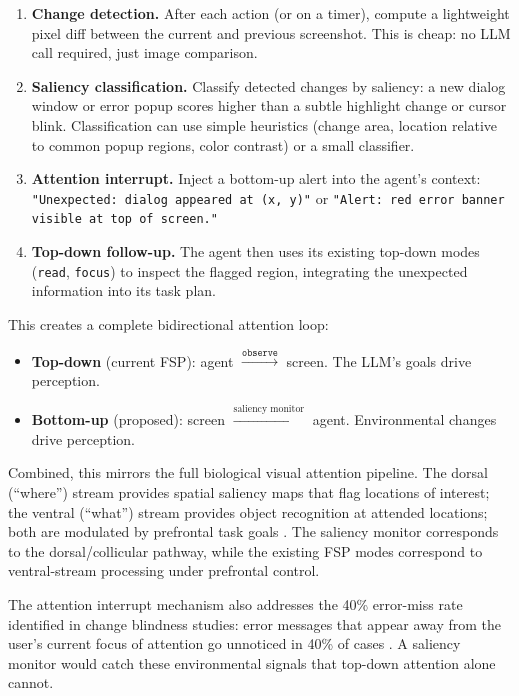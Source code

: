 \documentclass[11pt,a4paper]{article}
\begin{document}
\begin{enumerate}
    \item \textbf{Change detection.} After each action (or on a timer), compute a lightweight pixel diff between the current and previous screenshot. This is cheap: no LLM call required, just image comparison.
    \item \textbf{Saliency classification.} Classify detected changes by saliency: a new dialog window or error popup scores higher than a subtle highlight change or cursor blink. Classification can use simple heuristics (change area, location relative to common popup regions, color contrast) or a small classifier.
    \item \textbf{Attention interrupt.} Inject a bottom-up alert into the agent's context: \texttt{"Unexpected: dialog appeared at (x, y)"} or \texttt{"Alert: red error banner visible at top of screen."}
    \item \textbf{Top-down follow-up.} The agent then uses its existing top-down modes (\texttt{read}, \texttt{focus}) to inspect the flagged region, integrating the unexpected information into its task plan.
\end{enumerate}

This creates a complete bidirectional attention loop:

\begin{itemize}
    \item \textbf{Top-down} (current FSP): agent $\xrightarrow{\texttt{observe}}$ screen. The LLM's goals drive perception.
    \item \textbf{Bottom-up} (proposed): screen $\xrightarrow{\text{saliency monitor}}$ agent. Environmental changes drive perception.
\end{itemize}

Combined, this mirrors the full biological visual attention pipeline. The dorsal (``where'') stream provides spatial saliency maps that flag locations of interest; the ventral (``what'') stream provides object recognition at attended locations; both are modulated by prefrontal task goals \cite{goodale1992separate, corbetta2002control}. The saliency monitor corresponds to the dorsal/collicular pathway, while the existing FSP modes correspond to ventral-stream processing under prefrontal control.

The attention interrupt mechanism also addresses the 40\% error-miss rate identified in change blindness studies: error messages that appear away from the user's current focus of attention go unnoticed in 40\% of cases \cite{nngroup-change-blindness}. A saliency monitor would catch these environmental signals that top-down attention alone cannot.
\end{document}
